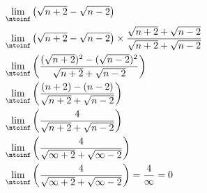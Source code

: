 
\begin{align}
    \lim_{\ntoinf}&\left( \sqrt{n + 2} - \sqrt{n - 2} \right) \\
    \lim_{\ntoinf}&\left( \sqrt{n + 2} - \sqrt{n - 2} \right) 
    \times \frac{\sqrt{n + 2} + \sqrt{n - 2}}{\sqrt{n + 2} + \sqrt{n - 2}} \\
    \lim_{\ntoinf}&\left( \frac{ (\sqrt{n + 2})^2 - (\sqrt{n - 2})^2 }{\sqrt{n + 2} + \sqrt{n - 2}} \right) \\
    \lim_{\ntoinf}&\left( \frac{ (n + 2) - (n - 2) }{\sqrt{n + 2} + \sqrt{n - 2}} \right) \\
    \lim_{\ntoinf}&\left( \frac{ 4 }{\sqrt{n + 2} + \sqrt{n - 2}} \right) \\
    \lim_{\ntoinf}&\left( \frac{ 4 }{\sqrt{\infty + 2} + \sqrt{\infty - 2}} \right) \\
    \lim_{\ntoinf}&\left( \frac{ 4 }{\sqrt{\infty + 2} + \sqrt{\infty - 2}} \right) 
    = \frac{4}{\infty} = 0\\
\end{align}

\pagebreak
